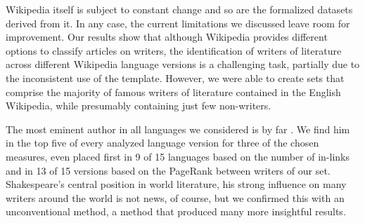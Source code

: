 \documentclass[a4paper,12pt]{scrartcl}
\begin{document}
Wikipedia itself is subject to constant change and so are the formalized
datasets derived from it.
In any case, the current limitations we discussed leave room for
improvement.
Our results show that although Wikipedia provides different options to
classify articles on writers, the identification of writers of literature
across different Wikipedia language versions is a challenging task,
partially due to the inconsistent use of the  template.
%
%
However, we were able to create sets that %
comprise the majority of famous writers of literature contained in the
English Wikipedia, while presumably containing just few non-writers.
%
%
%

The most eminent author in all languages we considered is by far
. We find him in the top five of every
analyzed language version for three of the chosen measures, even placed
first in 9 of 15 languages based on the number of in-links and in 13
of 15 versions based on the PageRank between writers of our
set. Shakespeare's central position in world literature, his strong
influence on many writers around the world is not news, of course, but
we confirmed this with an unconventional method, a method that
produced many more insightful results.
\end{document}
